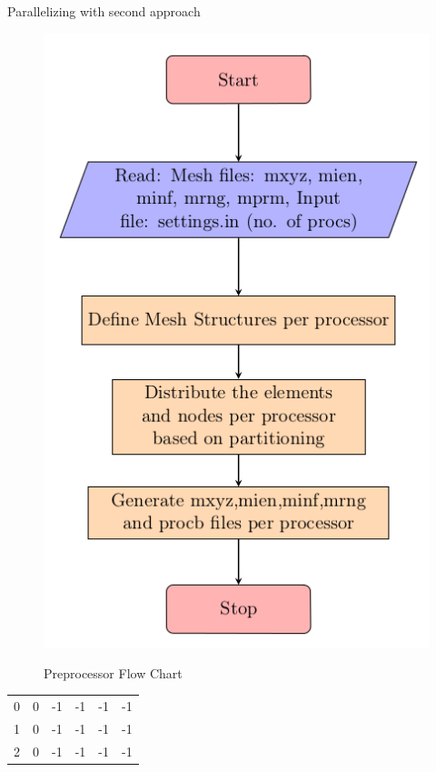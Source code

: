 \documentclass[t,english]{beamer}
\begin{document}
\begin{frame}{Parallelizing with second approach}
\begin{multicols}{2}
\begin{figure}[!htb]
\centering
\includegraphics[trim=0 0 0 50,scale=0.3]{./preprocessorflowchart.png}

Preprocessor Flow Chart
\end{figure}

\columnbreak

\begin{center}
\begin{tabular}{cccccc}

0 & 0 & -1 & -1 & -1 & -1 \\ 

1 & 0 & -1 & -1 & -1 & -1 \\ 

2 & 0 & -1 & -1 & -1 & -1 \\ 


\end{tabular}
\end{center}
\end{multicols}
\end{frame}
\end{document}
